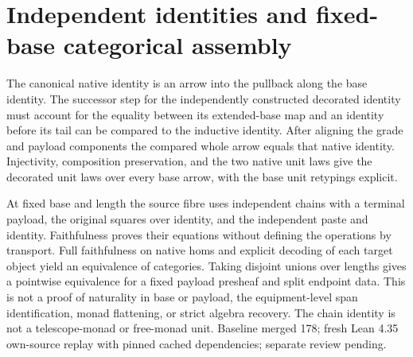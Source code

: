 \documentclass{article}
\begin{document}
\section*{Independent identities and fixed-base categorical assembly}
The canonical native identity is an arrow into the pullback along the base identity. The successor step for the independently constructed decorated identity must account for the equality between its extended-base map and an identity before its tail can be compared to the inductive identity. After aligning the grade and payload components the compared whole arrow equals that native identity. Injectivity, composition preservation, and the two native unit laws give the decorated unit laws over every base arrow, with the base unit retypings explicit.

At fixed base and length the source fibre uses independent chains with a terminal payload, the original squares over identity, and the independent paste and identity. Faithfulness proves their equations without defining the operations by transport. Full faithfulness on native homs and explicit decoding of each target object yield an equivalence of categories. Taking disjoint unions over lengths gives a pointwise equivalence for a fixed payload presheaf and split endpoint data. This is not a proof of naturality in base or payload, the equipment-level span identification, monad flattening, or strict algebra recovery. The chain identity is not a telescope-monad or free-monad unit. Baseline merged 178; fresh Lean 4.35 own-source replay with pinned cached dependencies; separate review pending.
\end{document}
